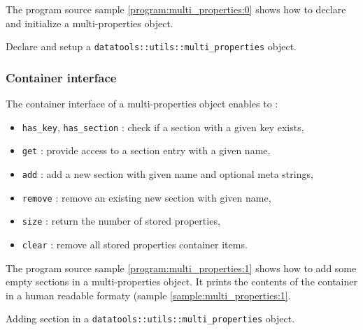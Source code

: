 \pn The program source sample \ref{program:multi_properties:0} shows how to 
declare and initialize a multi-properties object.
\begin{program}[h]
\caption{Declare and setup a
  \texttt{datatools::utils::multi\_properties}   object.    
}
\label{program:multi_properties:0}
\end{program}

\subsubsection{Container interface}

\pn The container interface of a multi-properties object enables to :
\begin{itemize}

\item  \texttt{has\_key}, \texttt{has\_section} :  check if  a section
  with a given key exists,

\item \texttt{get}  : provide access to  a section entry  with a given
  name,

\item \texttt{add}  : add a new  section with given  name and optional
  meta strings,

\item  \texttt{remove} :  remove an  existing new  section  with given
  name,

\item \texttt{size} : return the number of stored properties,

\item \texttt{clear} : remove all stored properties container items.

\end{itemize}

\pn The  program source sample  \ref{program:multi_properties:1} shows
how to add some empty sections in a multi-properties object. It prints
the  contents of  the container  in a  human readable  formaty (sample
\ref{sample:multi_properties:1}.

\begin{program}[h]
\caption{Adding section in  a
  \texttt{datatools::utils::multi\_properties}   object.    
}
\label{program:multi_properties:1}
\end{program}


